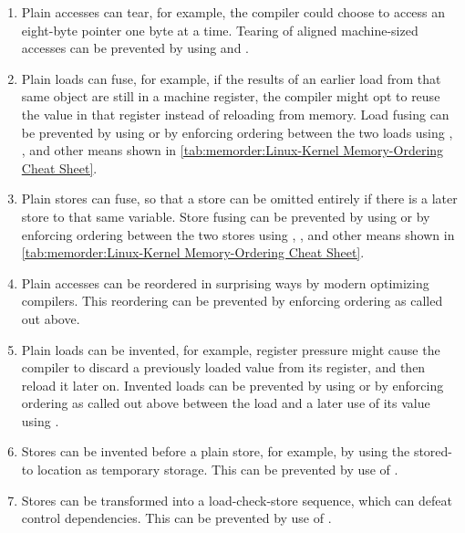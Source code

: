 \begin{enumerate}
\item	Plain accesses can tear, for example, the compiler could choose
	to access an eight-byte pointer one byte at a time.
	Tearing of aligned machine-sized accesses can be prevented by
	using  and .
\item	Plain loads can fuse, for example, if the results of an earlier
	load from that same object are still in a machine register,
	the compiler might opt to reuse the value in that register
	instead of reloading from memory.
	Load fusing can be prevented by using  or by
	enforcing ordering between the two loads using ,
	, and other means shown in
	\cref{tab:memorder:Linux-Kernel Memory-Ordering Cheat Sheet}.
\item	Plain stores can fuse, so that a store can be omitted entirely
	if there is a later store to that same variable.
	Store fusing can be prevented by using  or by
	enforcing ordering between the two stores using ,
	, and other means shown in
	\cref{tab:memorder:Linux-Kernel Memory-Ordering Cheat Sheet}.
\item	Plain accesses can be reordered in surprising ways by modern
	optimizing compilers.
	This reordering can be prevented by enforcing ordering as
	called out above.
\item	Plain loads can be invented, for example, register pressure might
	cause the compiler to discard a previously loaded value from
	its register, and then reload it later on.
	Invented loads can be prevented by using  or by
	enforcing ordering as called out above between the load and a
	later use of its value using .
\item	Stores can be invented before a plain store, for example, by
	using the stored-to location as temporary storage.
	This can be prevented by use of .
\item	Stores can be transformed into a load-check-store sequence,
	which can defeat control dependencies.
	This can be prevented by use of .
\end{enumerate}

\QuickQuizEnd

